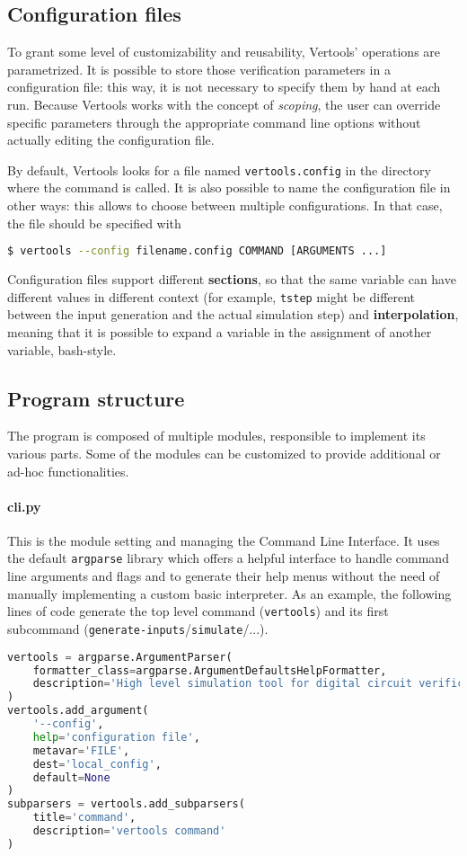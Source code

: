 \subsection{Configuration files}
To grant some level of customizability and reusability, Vertools' operations are parametrized. It is possible to store those verification parameters in a configuration file: this way, it is not necessary to specify them by hand at each run.
Because Vertools works with the concept of \textit{scoping}, the user can override specific parameters through the appropriate command line options without actually editing the configuration file.

By default, Vertools looks for a file named \texttt{vertools.config} in the directory where the command is called. It is also possible to name the configuration file in other ways: this allows to choose between multiple configurations. In that case, the file should be specified with
\begin{lstlisting}[language=bash]
    $ vertools --config filename.config COMMAND [ARGUMENTS ...]
\end{lstlisting}
Configuration files support different \textbf{sections}, so that the same variable can have different values in different context (for example, \texttt{tstep} might be different between the input generation and the actual simulation step) and \textbf{interpolation}, meaning that it is possible to expand a variable in the assignment of another variable, bash-style.

\subsection{Program structure}
The program is composed of multiple modules, responsible to implement its various parts. Some of the modules can be customized to provide additional or ad-hoc functionalities.

\paragraph{cli.py} This is the module setting and managing the Command Line Interface. It uses the default \texttt{argparse} library which offers a helpful interface to handle command line arguments and flags and to generate their help menus without the need of manually implementing a custom basic interpreter. As an example, the following lines of code generate the top level command (\texttt{vertools}) and its first subcommand (\texttt{generate-inputs}/\texttt{simulate}/...).
\begin{lstlisting}[language=Python, keywords={None}]
vertools = argparse.ArgumentParser(
    formatter_class=argparse.ArgumentDefaultsHelpFormatter,
    description='High level simulation tool for digital circuit verification'
)
vertools.add_argument(
    '--config',
    help='configuration file',
    metavar='FILE',
    dest='local_config',
    default=None
)
subparsers = vertools.add_subparsers(
    title='command',
    description='vertools command'
)
\end{lstlisting}

